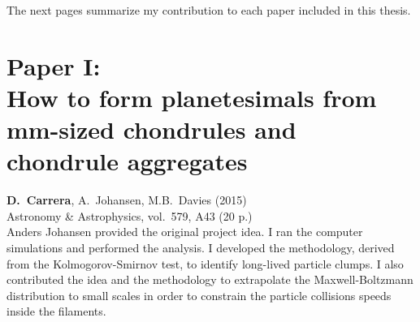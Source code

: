 \documentclass[11pt]{book}
\begin{document}
The next pages summarize my contribution to each paper included in this thesis.

\newpage

\section*{Paper I:\\How to form planetesimals from mm-sized chondrules and chondrule aggregates}

\textbf{D.~Carrera}, A.~Johansen, M.B.~Davies (2015) \\
Astronomy \& Astrophysics, vol.~579, A43 (20 p.)\\[6mm]

Anders Johansen provided the original project idea. I ran the computer simulations and performed the analysis. I developed the methodology, derived from the Kolmogorov-Smirnov test, to identify long-lived particle clumps. I also contributed the idea and the methodology to extrapolate the Maxwell-Boltzmann distribution to small scales in order to constrain the particle collisions speeds inside the filaments.



%

\cleardoublepage
{}
\thispagestyle{empty}
\vspace*{2cm}  %
\hfill{ 
	\fontsize{20}{30}
	\selectfont {\bf Paper I}
}
\marginpar{\rule[-4mm]{50mm}{14mm}} %
\vfill
\cleardoublepage

\end{document}
